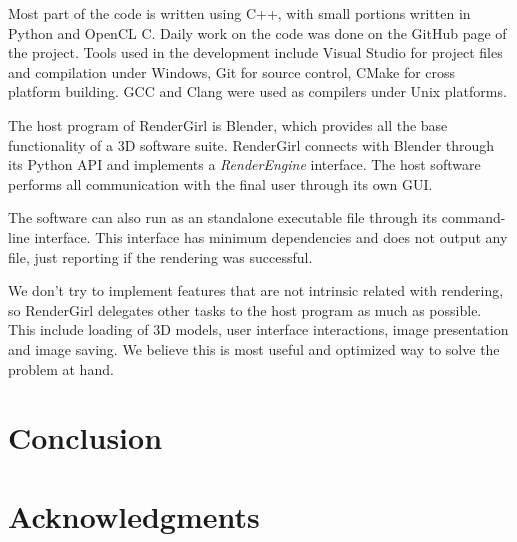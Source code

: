 \documentclass[a4paper]{sbgames}               %
\begin{document}
Most part of the code is written using C++, with small portions
written in Python and OpenCL C. Daily work on the code was done on the
GitHub page of the project\cite{RenderGirl}. Tools used in the
development include Visual Studio for project files and compilation
under Windows, Git for source control, CMake for cross platform
building. GCC and Clang were used as compilers under Unix platforms.

The host program of RenderGirl is Blender, which provides all the base
functionality of a 3D software suite. RenderGirl connects with Blender
through its Python API and implements a \emph{RenderEngine}
interface. The host software performs all communication with the final
user through its own GUI.

The software can also run as an standalone executable file through its
command-line interface. This interface has minimum dependencies and
does not output any file, just reporting if the rendering was successful.

We don't try to implement features that are not intrinsic related with
rendering, so RenderGirl delegates other tasks to the host program as
much as possible. This include loading of 3D models, user interface
interactions, image presentation and image saving. We believe this is
most useful and optimized way to solve the problem at hand.

\section{Conclusion}
\label{sec:conclusion}

\section*{Acknowledgments}




\end{document}
